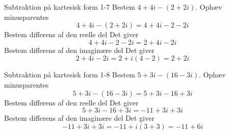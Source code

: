 \documentclass{article}
\begin{document}
\newpage
\begin{exercise}{Subtraktion på kartesisk form 1-7}
Bestem $4 + 4i - (2 + 2i)$.
\hint
Ophæv minusparentes
\[4 + 4i - (2 + 2i) = 4 + 4i - 2 - 2i
\]
\hint
Bestem differens af den reelle del
\hint
Det giver
\[4 + 4i - 2 - 2i = 2 + 4i - 2i
\]
\hint
Bestem differens af den imaginære del
\hint
Det giver
\[2 + 4i - 2i = 2 + i(4 - 2) = 2 + 2i
 \]
\end{exercise}
\newpage
\begin{exercise}{Subtraktion på kartesisk form 1-8}
Bestem $5 + 3i - (16 - 3i)$.
\hint
Ophæv minusparentes
\[5 + 3i - (16 - 3i) = 5 + 3i - 16 + 3i
\]
\hint
Bestem differens af den reelle del
\hint
Det giver
\[5 + 3i - 16 + 3i = - 11 + 3i + 3i
\]
\hint
Bestem differens af den imaginære del
\hint
Det giver
\[ - 11 + 3i + 3i = - 11 + i(3 + 3) = - 11 + 6i
\]
\end{exercise}
\end{document}
